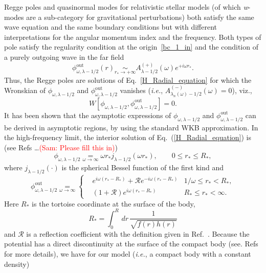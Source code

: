 \documentclass[aps,prd,longbibliography,reprint,twocolumn,amsmath,amssymb,amsfonts,showpacs,superscriptaddress]{revtex4-1}%
\newcommand{\sam}[1]{\textcolor{red}{(Sam: #1)}}
\newcommand{\phiout}{\phi^{\text{out}}_{\omega, \lambda-1/2}}
\newcommand{\phireg}{\phi^{}_{\omega, \lambda-1/2}}
\begin{document}
Regge poles and quasinormal modes for relativistic stellar models (of which \textit{w}-modes are a sub-category for gravitational perturbations) both satisfy the same wave equation and the same boundary conditions but with different interpretations for the angular momentum index and the frequency. Both types of pole satisfy the regularity condition at the origin~\eqref{bc_1_in} and the condition of a purely outgoing wave in the far field
%
\begin{equation}\label{bc_pole_inf}
\phiout (r) \scriptstyle{\underset{r_\ast \to +\infty}{\sim}}
\displaystyle{  A^{(+)}_{\lambda-1/2} (\omega) e^{+i\omega r_\ast}}.
\end{equation}
%
Thus, the Regge poles are solutions of Eq.~\eqref{H_Radial_equation} for which the  Wronskian of $\phireg$ and $\phiout$ vanishes (\textit{i.e.}, $A^{(-)}_{\lambda_n(\omega)-1/2} (\omega)=0$), viz.,
\begin{equation}\label{Wronskian}
  W[\phireg, \phiout ]= 0 .
\end{equation}
It has been shown \cite{Zhang:2011pq} that the asymptotic expressions of $\phireg$ and $\phiout$ can be derived in asymptotic regions, by using the standard WKB approximation. In the high-frequency limit, the interior solution of Eq.~(\ref{H_Radial_equation}) is (see Refs \ldots \sam{Please fill this in})
\begin{equation}\label{Approx_origin}
  \phireg \underset{\omega \to \infty}{=} \omega r_* j_{\lambda-1/2} (\omega r_*),  \quad\quad 0\leq r_*\leq R_* ,
\end{equation}
where $j_{\lambda-1/2}(\cdot)$ is the spherical Bessel function of the first kind and
\begin{equation}
\label{Approx_infinity}
\phiout  \scriptstyle{\underset{\omega \to \infty}{=}}
\left\{
\begin{aligned}
&e^{i\omega(r_*-R_*)}+\mathcal{R} e^{-i\omega (r_*-R_*)}& \scriptstyle{1/\omega\leq r_{*} < R_*,}\\
&\left(1+\mathcal{R}\right) e^{i\omega(r_*-R_*)}        & \scriptstyle{R_*\leq r_{*}<\infty.}
\end{aligned}
\right.
\end{equation}
Here $R_*$ is the tortoise coordinate at the surface of the body, 
\begin{equation}\label{R_star}
  R_*=\int_{0}^{R}\, dr\,\frac{1}{\sqrt{f(r)h(r)}}
\end{equation}
and $\mathcal{R}$ is a reflection coefficient with the definition given in Ref.~\cite{Berry_1982}.
Because the potential has a direct discontinuity at the surface of the compact body (see. Refs \cite{Zhang:2011pq,Berry_1982} for more details), we have for our model (\textit{i.e.}, a compact body with a constant density)
\end{document}
